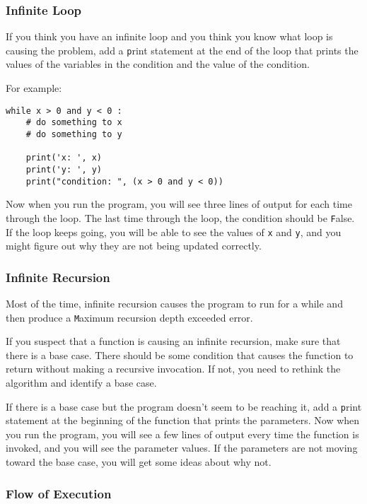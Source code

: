 \documentclass[
DIV=11,
fontsize=12,
twoside,
headinclude=false,
titlepage=firstiscover,
abstract=true,
headsepline=true,
footsepline=true,
chapterprefix=true, %
headings=big,
bibliography=totoc,%
captions=tableheading
]{scrbook}
\theoremstyle{definition}
\begin{document}
\subsubsection{Infinite Loop}

If you think you have an infinite loop and you think you know
what loop is causing the problem, add a {\texttt print} statement at
the end of the loop that prints the values of the variables in
the condition and the value of the condition.

For example:

\begin{lstlisting}
while x > 0 and y < 0 :
    # do something to x
    # do something to y

    print('x: ', x)
    print('y: ', y)
    print("condition: ", (x > 0 and y < 0))
\end{lstlisting}
%
Now when you run the program, you will see three lines of output
for each time through the loop.  The last time through the
loop, the condition should be {\texttt False}.  If the loop keeps
going, you will be able to see the values of {\texttt x} and {\texttt y},
and you might figure out why they are not being updated correctly.


\subsubsection{Infinite Recursion}

Most of the time, infinite recursion causes the program to run
for a while and then produce a {\texttt Maximum recursion depth exceeded}
error.

If you suspect that a function is causing an infinite
recursion, make sure that there is a base case.
There should be some condition that causes the
function to return without making a recursive invocation.
If not, you need to rethink the algorithm and identify a base
case.

If there is a base case but the program doesn't seem to be reaching
it, add a {\texttt print} statement at the beginning of the function
that prints the parameters.  Now when you run the program, you will see
a few lines of output every time the function is invoked,
and you will see the parameter values.  If the parameters are not moving
toward the base case, you will get some ideas about why not.


\subsubsection{Flow of Execution}
\end{document}
